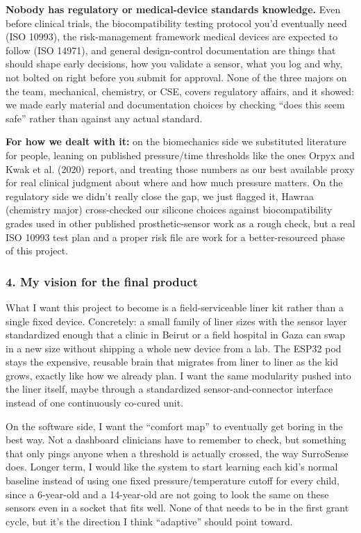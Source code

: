 \textbf{Nobody has regulatory or medical-device standards knowledge.} Even before clinical trials, the biocompatibility testing protocol you'd eventually need (ISO 10993), the risk-management framework medical devices are expected to follow (ISO 14971), and general design-control documentation are things that should shape early decisions, how you validate a sensor, what you log and why, not bolted on right before you submit for approval. None of the three majors on the team, mechanical, chemistry, or CSE, covers regulatory affairs, and it showed: we made early material and documentation choices by checking “does this seem safe” rather than against any actual standard.

\textbf{For how we dealt with it:} on the biomechanics side we substituted literature for people, leaning on published pressure/time thresholds like the ones Orpyx and Kwak et al. (2020) report, and treating those numbers as our best available proxy for real clinical judgment about where and how much pressure matters. On the regulatory side we didn't really close the gap, we just flagged it, Hawraa (chemistry major) cross-checked our silicone choices against biocompatibility grades used in other published prosthetic-sensor work as a rough check, but a real ISO 10993 test plan and a proper risk file are work for a better-resourced phase of this project.

\subsubsection*{4. My vision for the final product}

What I want this project to become is a field-serviceable liner kit rather than a single fixed device. Concretely: a small family of liner sizes with the sensor layer standardized enough that a clinic in Beirut or a field hospital in Gaza can swap in a new size without shipping a whole new device from a lab. The ESP32 pod stays the expensive, reusable brain that migrates from liner to liner as the kid grows, exactly like how we already plan. I want the same modularity pushed into the liner itself, maybe through a standardized sensor-and-connector interface instead of one continuously co-cured unit.

On the software side, I want the “comfort map” to eventually get boring in the best way. Not a dashboard clinicians have to remember to check, but something that only pings anyone when a threshold is actually crossed, the way SurroSense does. Longer term, I would like the system to start learning each kid's normal baseline instead of using one fixed pressure/temperature cutoff for every child, since a 6-year-old and a 14-year-old are not going to look the same on these sensors even in a socket that fits well. None of that needs to be in the first grant cycle, but it's the direction I think “adaptive” should point toward.

